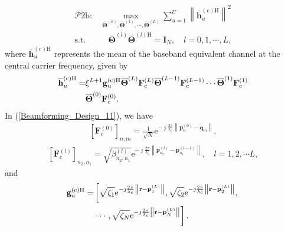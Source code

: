\documentclass[lettersize,journal]{IEEEtran}
\theoremstyle{remark}
\begin{document}
\begin{align}\label{Beamforming_Design_10}
    \mathcal{P}\mathrm{2b}:&\max_{\overline{\mathbf{\Theta}}^{(0)},\overline{\mathbf{\Theta}}^{(1)},
    \cdots,\overline{\mathbf{\Theta}}^{(L)}}
    \sum_{u=1}^{U}\left\|\overline{\mathbf{h}}_u^{(\mathrm{c})\mathrm{H}}\right\|^2\\
    \text{s.t.}&\quad \overline{\mathbf{\Theta}}^{(l)}
    \overline{\mathbf{\Theta}}^{(l)\mathrm{H}}=\mathbf{I}_N,
    \quad l=0,1,\cdots,L,
\end{align}
where $\overline{\mathbf{h}}_u^{(\mathrm{c})\mathrm{H}}$ represents the mean of the baseband equivalent channel at the central carrier frequency, given by
\begin{align}\label{Beamforming_Design_11}
    \notag\overline{\mathbf{h}}_u^{(\mathrm{c})\mathrm{H}}
    =&\xi^{L+1}\mathbf{g}_u^{(\mathrm{c})\mathrm{H}}\overline{\mathbf{\Theta}}^{(L)}
    \mathbf{F}_\mathrm{c}^{(L)}\overline{\mathbf{\Theta}}^{(L-1)}\mathbf{F}_\mathrm{c}^{(L-1)}
    \cdots\overline{\mathbf{\Theta}}^{(1)}\mathbf{F}_\mathrm{c}^{(1)}\\
    &\overline{\mathbf{\Theta}}^{(0)}\mathbf{F}_\mathrm{c}^{(0)}.
\end{align}
In (\ref{Beamforming_Design_11}), we have
\begin{align}\label{Beamforming_Design_12}
    \left[\mathbf{F}_\mathrm{c}^{(0)}\right]_{n,m}=\frac{1}{\sqrt{N}}\mathrm{e}^{-\jmath \frac{2\pi}{\lambda_\mathrm{c}}
    \left\|\mathbf{p}_{n}^{(0)}-\mathbf{q}_{m}\right\|},
\end{align}
\begin{align}\label{Beamforming_Design_13}
    \left[\mathbf{F}_\mathrm{c}^{(l)}\right]_{n_2,n_1}=\sqrt{\beta_{n_2,n_1}^{(l)}}
    \mathrm{e}^{-\jmath \frac{2\pi}{\lambda_\mathrm{c}}
    \left\|\mathbf{p}_{n_2}^{(l)}-\mathbf{p}_{n_1}^{(l-1)}\right\|},\quad l=1,2,\cdots L,
\end{align}
and
\begin{align}\label{Beamforming_Design_14}
    \notag\mathbf{g}_u^{(\mathrm{c})\mathrm{H}}=&\left[
    \sqrt{\zeta_{1}}\mathrm{e}^{-\jmath\frac{2\pi}{\lambda_\mathrm{c}}
    \left\|\mathbf{r}-\mathbf{p}_{1}^{(L)}\right\|},
    \sqrt{\zeta_{2}}\mathrm{e}^{-\jmath\frac{2\pi}{\lambda_\mathrm{c}}
    \left\|\mathbf{r}-\mathbf{p}_{2}^{(L)}\right\|},\right.\\
    &\left.\cdots,\sqrt{\zeta_{N}}\mathrm{e}^{-\jmath\frac{2\pi}{\lambda_\mathrm{c}}
    \left\|\mathbf{r}-\mathbf{p}_{N}^{(L)}\right\|}
    \right].
\end{align}
\end{document}
